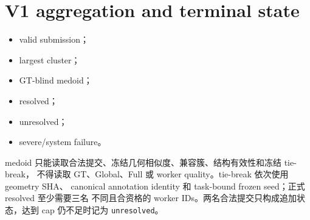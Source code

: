 \section{V1 aggregation and terminal state}

\begin{itemize}
  \item valid submission；
  \item largest cluster；
  \item GT-blind medoid；
  \item resolved；
  \item unresolved；
  \item severe/system failure。
\end{itemize}

medoid 只能读取合法提交、冻结几何相似度、兼容簇、结构有效性和冻结 tie-break，
不得读取 GT、Global、Full 或 worker quality。tie-break 依次使用 geometry SHA、
canonical annotation identity 和 task-bound frozen seed；正式 resolved 至少需要三名
不同且合资格的 worker IDs。两名合法提交只构成追加状态，达到 cap 仍不足时记为
\texttt{unresolved}。
